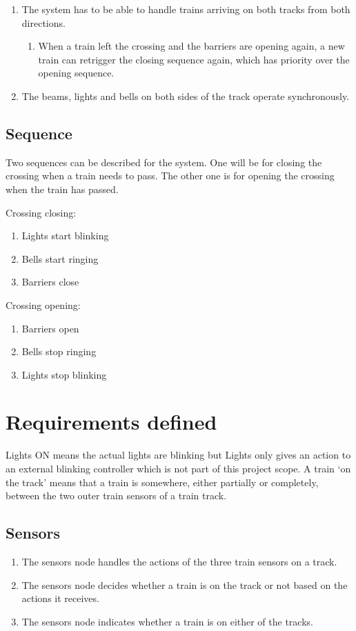 \documentclass[final]{report}
\begin{document}
\begin{enumerate}
\item The system has to be able to handle trains arriving on both tracks from both directions.
	\begin{enumerate}
	\item When a train left the crossing and the barriers are opening again, a new train can retrigger the closing sequence again, which has priority over the opening sequence.
	\end{enumerate}

\item The beams, lights and bells on both sides of the track operate synchronously.
\end{enumerate}


\subsection{Sequence}
Two sequences can be described for the system.
One will be for closing the crossing when a train needs to pass. The other one is for opening the crossing when the train has passed.

Crossing closing:
\begin{enumerate}
\item Lights start blinking
\item Bells start ringing
\item Barriers close
\end{enumerate}

Crossing opening:
\begin{enumerate}
\item Barriers open
\item Bells stop ringing
\item Lights stop blinking
\end{enumerate}

\section{Requirements defined}
Lights ON means the actual lights are blinking but Lights only gives an action to an external blinking controller which is not part of this project scope.
A train `on the track' means that a train is somewhere, either partially or completely, between the two outer train sensors of a train track.

\subsection{Sensors}
	\begin{enumerate}
		\item The sensors node handles the actions of the three train sensors on a track.
		\item The sensors node decides whether a train is on the track or not based on the actions it receives.
		\item The sensors node indicates whether a train is on either of the tracks.
	\end{enumerate}
\end{document}
